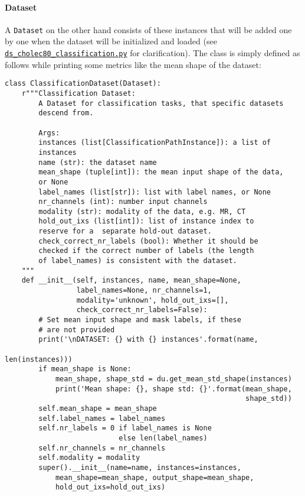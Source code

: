 \documentclass{article}
\begin{document}
\paragraph{Dataset}
A \texttt{Dataset} on the other hand consists of these instances that will be added one by one when the dataset will be initialized and loaded (see \href{https://github.com/amrane99/CAI-Classification/blob/AR/cai/data/datasets/ds_cholec80_classification.py}{\texttt{ds\_cholec80\_classification.py}} for clarification). The class is simply defined as follows while printing some metrics like the mean shape of the dataset:

\begin{verbatim}
class ClassificationDataset(Dataset):
    r"""Classification Dataset: 
        A Dataset for classification tasks, that specific datasets
        descend from.

        Args:
        instances (list[ClassificationPathInstance]): a list of
        instances
        name (str): the dataset name
        mean_shape (tuple[int]): the mean input shape of the data,
        or None
        label_names (list[str]): list with label names, or None
        nr_channels (int): number input channels
        modality (str): modality of the data, e.g. MR, CT
        hold_out_ixs (list[int]): list of instance index to
        reserve for a  separate hold-out dataset.
        check_correct_nr_labels (bool): Whether it should be
        checked if the correct number of labels (the length
        of label_names) is consistent with the dataset. 
    """
    def __init__(self, instances, name, mean_shape=None, 
                 label_names=None, nr_channels=1,
                 modality='unknown', hold_out_ixs=[],
                 check_correct_nr_labels=False):
        # Set mean input shape and mask labels, if these
        # are not provided
        print('\nDATASET: {} with {} instances'.format(name,
                                                       len(instances)))
        if mean_shape is None:
            mean_shape, shape_std = du.get_mean_std_shape(instances)
            print('Mean shape: {}, shape std: {}'.format(mean_shape,
                                                         shape_std))
        self.mean_shape = mean_shape
        self.label_names = label_names
        self.nr_labels = 0 if label_names is None 
                           else len(label_names)
        self.nr_channels = nr_channels
        self.modality = modality
        super().__init__(name=name, instances=instances, 
            mean_shape=mean_shape, output_shape=mean_shape, 
            hold_out_ixs=hold_out_ixs)
\end{verbatim}
\end{document}
